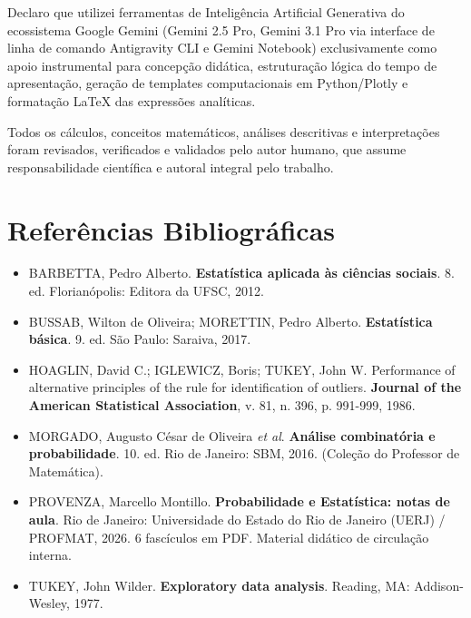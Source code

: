 \documentclass[12pt,a4paper]{article}
\begin{document}
Declaro que utilizei ferramentas de Inteligência Artificial Generativa do ecossistema Google Gemini (Gemini 2.5 Pro, Gemini 3.1 Pro via interface de linha de comando Antigravity CLI e Gemini Notebook) exclusivamente como apoio instrumental para concepção didática, estruturação lógica do tempo de apresentação, geração de templates computacionais em Python/Plotly e formatação \LaTeX{} das expressões analíticas.

Todos os cálculos, conceitos matemáticos, análises descritivas e interpretações foram revisados, verificados e validados pelo autor humano, que assume responsabilidade científica e autoral integral pelo trabalho.

\section{Referências Bibliográficas}
\begin{itemize}
    \item BARBETTA, Pedro Alberto. \textbf{Estatística aplicada às ciências sociais}. 8. ed. Florianópolis: Editora da UFSC, 2012.
    \item BUSSAB, Wilton de Oliveira; MORETTIN, Pedro Alberto. \textbf{Estatística básica}. 9. ed. São Paulo: Saraiva, 2017.
    \item HOAGLIN, David C.; IGLEWICZ, Boris; TUKEY, John W. Performance of alternative principles of the rule for identification of outliers. \textbf{Journal of the American Statistical Association}, v. 81, n. 396, p. 991-999, 1986.
    \item MORGADO, Augusto César de Oliveira \textit{et al}. \textbf{Análise combinatória e probabilidade}. 10. ed. Rio de Janeiro: SBM, 2016. (Coleção do Professor de Matemática).
    \item PROVENZA, Marcello Montillo. \textbf{Probabilidade e Estatística: notas de aula}. Rio de Janeiro: Universidade do Estado do Rio de Janeiro (UERJ) / PROFMAT, 2026. 6 fascículos em PDF. Material didático de circulação interna.
    \item TUKEY, John Wilder. \textbf{Exploratory data analysis}. Reading, MA: Addison-Wesley, 1977.
\end{itemize}
\end{document}
